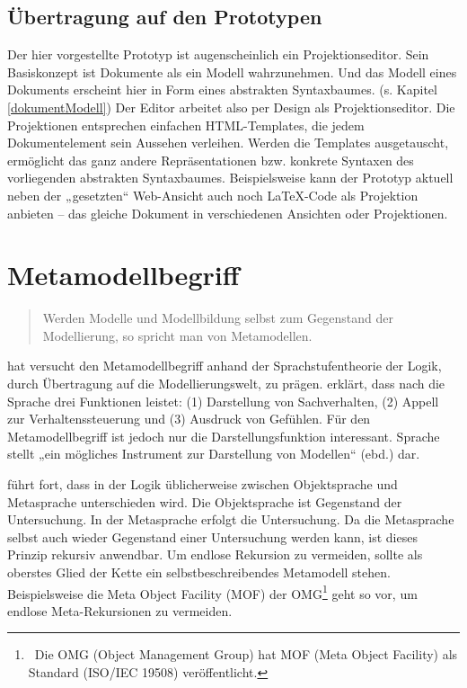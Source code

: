 \subsection{Übertragung auf den Prototypen}\label{}
 
Der hier vorgestellte Prototyp ist augenscheinlich ein Projektionseditor. Sein Basiskonzept ist Dokumente als ein Modell wahrzunehmen. Und das Modell eines Dokuments erscheint hier in Form eines abstrakten Syntaxbaumes. (s. Kapitel \ref{dokumentModell}) Der Editor arbeitet also per Design als Projektionseditor. Die Projektionen entsprechen einfachen HTML-Templates, die jedem Dokumentelement sein Aussehen verleihen. Werden die Templates ausgetauscht, ermöglicht das ganz andere Repräsentationen bzw. konkrete Syntaxen des vorliegenden abstrakten Syntaxbaumes. Beispielsweise kann der Prototyp aktuell neben der „gesetzten“ Web-Ansicht auch noch LaTeX-Code als Projektion anbieten -- das gleiche Dokument in verschiedenen Ansichten oder Projektionen.

 
\section{Metamodellbegriff}\label{metamodellbegriff-sec}
 
\begin{quote}
 Werden Modelle und Modellbildung selbst zum Gegenstand der Modellierung, so spricht man von Metamodellen. \citep[S.~1]{Strahringer}
\end{quote}
 
\citep{Strahringer} hat versucht den Metamodellbegriff anhand der Sprachstufentheorie der Logik, durch Übertragung auf die Modellierungswelt, zu prägen. \citep[S.~1]{Strahringer} erklärt, dass nach \citep{Buehler} die Sprache drei Funktionen leistet: (1) Darstellung von Sachverhalten, (2) Appell zur Verhaltenssteuerung und (3) Ausdruck von Gefühlen. Für den Metamodellbegriff ist jedoch nur die Darstellungsfunktion interessant. Sprache stellt „ein mögliches Instrument zur Darstellung von Modellen“ (ebd.) dar.

 
\citep[S.~1]{Strahringer} führt fort, dass in der Logik üblicherweise zwischen Objektsprache und Metasprache unterschieden wird. Die Objektsprache ist Gegenstand der Untersuchung. In der Metasprache erfolgt die Untersuchung. Da die Metasprache selbst auch wieder Gegenstand einer Untersuchung werden kann, ist dieses Prinzip rekursiv anwendbar. Um endlose Rekursion zu vermeiden, sollte als oberstes Glied der Kette ein selbstbeschreibendes Metamodell stehen. Beispielsweise die Meta Object Facility (MOF) der OMG\footnote{~Die OMG (Object Management Group) hat MOF (Meta Object Facility) als Standard (ISO/IEC 19508) veröffentlicht. } geht so vor, um endlose Meta-Rekursionen zu vermeiden.

